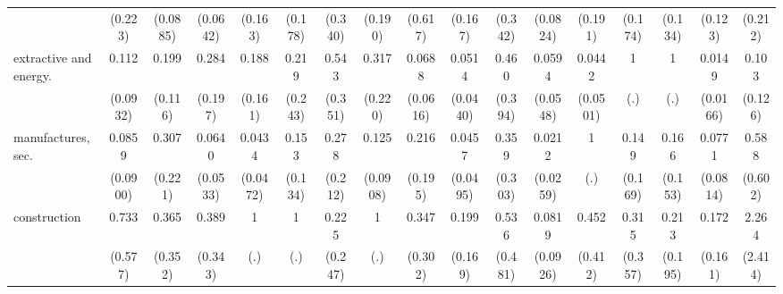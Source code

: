 {\begin{tabular}{l*{16}{c}}
                    &     (0.223)         &    (0.0885)         &    (0.0642)         &     (0.163)         &     (0.178)         &     (0.340)         &     (0.190)         &     (0.617)         &     (0.167)         &     (0.342)         &    (0.0824)         &     (0.191)         &     (0.174)         &     (0.134)         &     (0.123)         &     (0.212)         \\
[1em]
extractive and energy.&       0.112\sym{**} &       0.199\sym{**} &       0.284         &       0.188         &       0.219         &       0.543         &       0.317         &      0.0688\sym{**} &      0.0514\sym{***}&       0.460         &      0.0594\sym{**} &      0.0442\sym{**} &           1         &           1         &      0.0149\sym{***}&       0.103         \\
                    &    (0.0932)         &     (0.116)         &     (0.197)         &     (0.161)         &     (0.243)         &     (0.351)         &     (0.220)         &    (0.0616)         &    (0.0440)         &     (0.394)         &    (0.0548)         &    (0.0501)         &         (.)         &         (.)         &    (0.0166)         &     (0.126)         \\
[1em]
manufactures, sec.  &      0.0859\sym{*}  &       0.307         &      0.0640\sym{***}&      0.0434\sym{**} &       0.153\sym{*}  &       0.278         &       0.125\sym{**} &       0.216         &      0.0457\sym{**} &       0.359         &      0.0212\sym{**} &           1         &       0.149         &       0.166         &      0.0771\sym{*}  &       0.588         \\
                    &    (0.0900)         &     (0.221)         &    (0.0533)         &    (0.0472)         &     (0.134)         &     (0.212)         &    (0.0908)         &     (0.195)         &    (0.0495)         &     (0.303)         &    (0.0259)         &         (.)         &     (0.169)         &     (0.153)         &    (0.0814)         &     (0.602)         \\
[1em]
construction        &       0.733         &       0.365         &       0.389         &           1         &           1         &       0.225         &           1         &       0.347         &       0.199         &       0.536         &      0.0819\sym{*}  &       0.452         &       0.315         &       0.213         &       0.172         &       2.264         \\
                    &     (0.577)         &     (0.352)         &     (0.343)         &         (.)         &         (.)         &     (0.247)         &         (.)         &     (0.302)         &     (0.169)         &     (0.481)         &    (0.0926)         &     (0.412)         &     (0.357)         &     (0.195)         &     (0.161)         &     (2.414)         \\

\end{tabular}}
